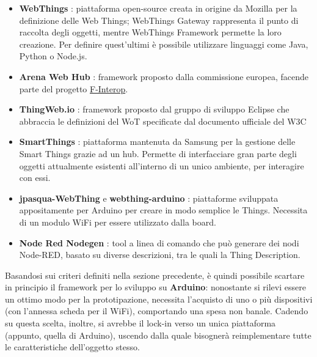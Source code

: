 \documentclass[12pt,a4paper,openright,oneside]{report}
\begin{document}
\begin{itemize}	
	\item \textbf{WebThings} \cite{webthings}: piattaforma open-source creata in origine da Mozilla per la definizione delle Web Things; WebThings Gateway rappresenta il punto di raccolta degli oggetti, mentre WebThings Framework permette la loro creazione. Per definire quest'ultimi è possibile utilizzare linguaggi come Java, Python o Node.js.
	
	\item \textbf{Arena Web Hub} \cite{arenawh}: framework proposto dalla commissione europea, facende parte del progetto \href{https://www.f-interop.eu/}{F-Interop}.
	
	
	\item \textbf{ThingWeb.io} \cite{thingweb}: framework proposto dal gruppo di sviluppo Eclipse che abbraccia le definizioni del WoT specificate dal documento ufficiale del W3C
	
	
	\item \textbf{SmartThings} \cite{smartthings}: piattaforma mantenuta da Samsung per la gestione delle Smart Things grazie ad un hub. Permette di interfacciare gran parte degli oggetti attualmente esistenti all'interno di un unico ambiente, per interagire con essi.
	
	\item \textbf{jpasqua-WebThing} \cite{jpasqua} e \textbf{webthing-arduino} \cite{wtarduino}: piattaforme sviluppata appositamente per Arduino per creare in modo semplice le Things. Necessita di un modulo WiFi per essere utilizzato dalla board.
	
	\item \textbf{Node Red Nodegen} \cite{nodered}: tool a linea di comando che può generare dei nodi Node-RED, basato su diverse descrizioni, tra le quali la Thing Description.
\end{itemize}


Basandosi sui criteri definiti nella sezione precedente, è quindi possibile scartare in principio il framework per lo sviluppo su \textbf{Arduino}: nonostante si rilevi essere un ottimo modo per la prototipazione, necessita l'acquisto di uno o più dispositivi (con l'annessa scheda per il WiFi), comportando una spesa non banale. Cadendo su questa scelta, inoltre, si avrebbe il lock-in verso un unica piattaforma (appunto, quella di Arduino), uscendo dalla quale bisognerà reimplementare tutte le caratteristiche dell'oggetto stesso.\\
\end{document}

